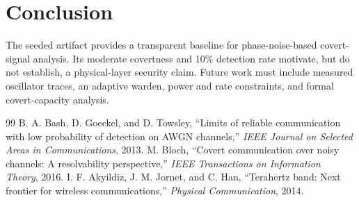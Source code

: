 \documentclass[sigconf]{acmart}
\begin{document}
\section{Conclusion}

The seeded artifact provides a transparent baseline for phase-noise-based covert-signal analysis. Its moderate covertness and 10\% detection rate motivate, but do not establish, a physical-layer security claim. Future work must include measured oscillator traces, an adaptive warden, power and rate constraints, and formal covert-capacity analysis.

\begin{thebibliography}{99}
 B. A. Bash, D. Goeckel, and D. Towsley, ``Limits of reliable communication with low probability of detection on AWGN channels,'' \emph{IEEE Journal on Selected Areas in Communications}, 2013.
 M. Bloch, ``Covert communication over noisy channels: A resolvability perspective,'' \emph{IEEE Transactions on Information Theory}, 2016.
 I. F. Akyildiz, J. M. Jornet, and C. Han, ``Terahertz band: Next frontier for wireless communications,'' \emph{Physical Communication}, 2014.
\end{thebibliography}
\end{document}
